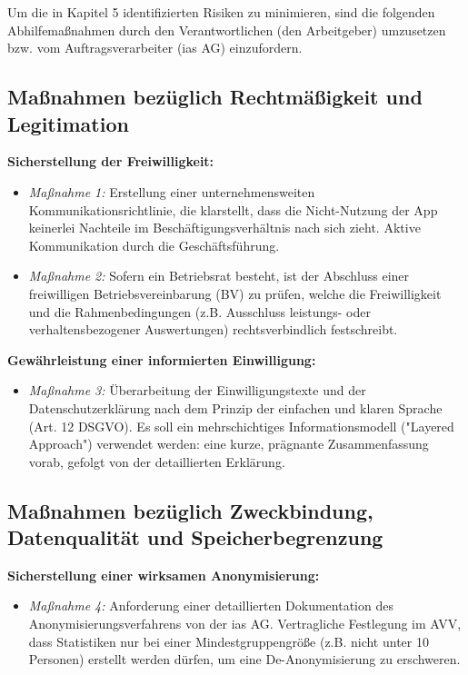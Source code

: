 \documentclass[12pt, a4paper]{article}
\begin{document}
Um die in Kapitel 5 identifizierten Risiken zu minimieren, sind die folgenden Abhilfemaßnahmen durch den Verantwortlichen (den Arbeitgeber) umzusetzen bzw. vom Auftragsverarbeiter (ias AG) einzufordern.

\subsection{Maßnahmen bezüglich Rechtmäßigkeit und Legitimation}
\textbf{Sicherstellung der Freiwilligkeit:}
\begin{itemize}
    \item \textit{Maßnahme 1:} Erstellung einer unternehmensweiten Kommunikationsrichtlinie, die klarstellt, dass die Nicht-Nutzung der App keinerlei Nachteile im Beschäftigungsverhältnis nach sich zieht. Aktive Kommunikation durch die Geschäftsführung.
    \item \textit{Maßnahme 2:} Sofern ein Betriebsrat besteht, ist der Abschluss einer freiwilligen Betriebsvereinbarung (BV) zu prüfen, welche die Freiwilligkeit und die Rahmenbedingungen (z.B. Ausschluss leistungs- oder verhaltensbezogener Auswertungen) rechtsverbindlich festschreibt.
\end{itemize}

\textbf{Gewährleistung einer informierten Einwilligung:}
\begin{itemize}
    \item \textit{Maßnahme 3:} Überarbeitung der Einwilligungstexte und der Datenschutzerklärung nach dem Prinzip der einfachen und klaren Sprache (Art. 12 DSGVO). Es soll ein mehrschichtiges Informationsmodell ("Layered Approach") verwendet werden: eine kurze, prägnante Zusammenfassung vorab, gefolgt von der detaillierten Erklärung.
\end{itemize}

\subsection{Maßnahmen bezüglich Zweckbindung, Datenqualität und Speicherbegrenzung}
\textbf{Sicherstellung einer wirksamen Anonymisierung:}
\begin{itemize}
    \item \textit{Maßnahme 4:} Anforderung einer detaillierten Dokumentation des Anonymisierungsverfahrens von der ias AG. Vertragliche Festlegung im AVV, dass Statistiken nur bei einer Mindestgruppengröße (z.B. nicht unter 10 Personen) erstellt werden dürfen, um eine De-Anonymisierung zu erschweren.
\end{itemize}
\end{document}
